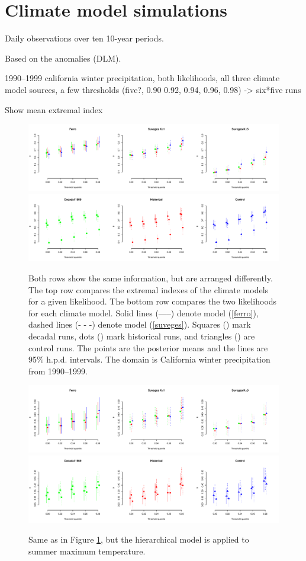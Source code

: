 \section{Climate model simulations}
\label{climate}

Daily observations over ten 10-year periods.

Based on the anomalies (DLM).

1990--1999 california winter precipitation, both likelihoods, all three climate model sources, a few thresholds (five?, 0.90 0.92, 0.94, 0.96, 0.98) -> six*five runs

Show mean extremal index

\begin{figure}
\begin{center}
\includegraphics[scale=0.46]{figs/winter_like.pdf}
\includegraphics[scale=0.46]{figs/winter_source.pdf}
\end{center}
\caption{Both rows show the same information, but are arranged differently. The top row compares the extremal indexes of the climate models for a given likelihood. The bottom row compares the two likelihoods for each climate model. Solid lines (-----) denote model (\ref{ferro}), dashed lines (- - -) denote model (\ref{suveges}). Squares (\symsquare) mark decadal runs, dots (\symcircle) mark historical runs, and triangles (\symtriangle) are control runs. The points are the posterior means and the lines are 95\% h.p.d. intervals. The domain is California winter precipitation from 1990--1999.}
\label{figwinter}
\end{figure}

\begin{figure}
\begin{center}
\includegraphics[scale=0.46]{figs/summer_like.pdf}
\includegraphics[scale=0.46]{figs/summer_source.pdf}
\end{center}
\caption{Same as in Figure \ref{figwinter}, but the hierarchical model is applied to summer maximum temperature.}
\label{figsummer}
\end{figure}
